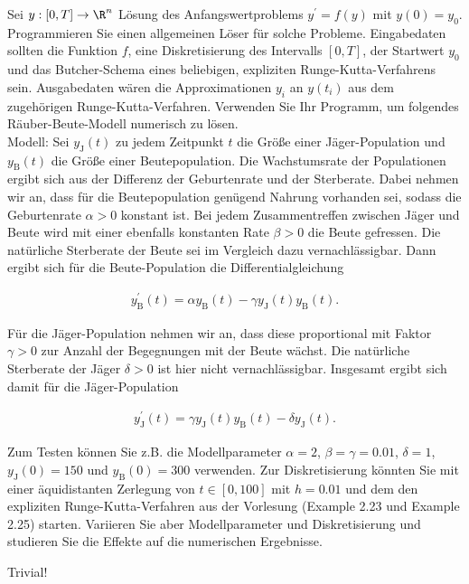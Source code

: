 \begin{exercise}

Sei $y: [0, T] \to \R^n$ Lösung des Anfangswertproblems $y^\prime = f(y)$ mit $y(0) = y_0$.
Programmieren Sie einen allgemeinen Löser für solche Probleme.
Eingabedaten sollten die Funktion $f$, eine Diskretisierung des Intervalls $[0, T]$, der Startwert $y_0$ und das Butcher-Schema eines beliebigen, expliziten Runge-Kutta-Verfahrens sein. Ausgabedaten wären die Approximationen $y_i$ an $y(t_i)$ aus dem zugehörigen Runge-Kutta-Verfahren.
Verwenden Sie Ihr Programm, um folgendes Räuber-Beute-Modell numerisch zu lösen. \\

Modell:
Sei $y_\mathrm{J}(t)$ zu jedem Zeitpunkt $t$ die Größe einer Jäger-Population und $y_\mathrm{B}(t)$ die Größe einer Beutepopulation.
Die Wachstumsrate der Populationen ergibt sich aus der Differenz der Geburtenrate und der Sterberate.
Dabei nehmen wir an, dass für die Beutepopulation genügend Nahrung vorhanden sei, sodass die Geburtenrate $\alpha > 0$ konstant ist.
Bei jedem Zusammentreffen zwischen Jäger und Beute wird mit einer ebenfalls konstanten Rate $\beta > 0$ die Beute gefressen.
Die natürliche Sterberate der Beute sei im Vergleich dazu vernachlässigbar.
Dann ergibt sich für die Beute-Population die Differentialgleichung

\begin{align}
  \label{Beute-Population}
  y_\mathrm{B}^\prime(t)
  =
  \alpha y_\mathrm{B}(t) - \gamma y_\mathrm{J}(t) y_\mathrm{B}(t).
  \tag{1a}
\end{align}

Für die Jäger-Population nehmen wir an, dass diese proportional mit Faktor $\gamma > 0$ zur Anzahl der Begegnungen mit der Beute wächst.
Die natürliche Sterberate der Jäger $\delta > 0$ ist hier nicht vernachlässigbar.
Insgesamt ergibt sich damit für die Jäger-Population

\begin{align}
  \label{Jäger-Population}
  y_\mathrm{J}^\prime(t)
  =
  \gamma y_\mathrm{J}(t) y_\mathrm{B}(t) - \delta y_\mathrm{J}(t).
  \tag{1b}
\end{align}

Zum Testen können Sie z.B. die Modellparameter $\alpha = 2$, $\beta = \gamma = 0.01$, $\delta = 1$, $y_\mathrm{J}(0) = 150$ und $y_\mathrm{B}(0) = 300$ verwenden.
Zur Diskretisierung könnten Sie mit einer äquidistanten Zerlegung von $t \in [0, 100]$ mit $h = 0.01$ und dem den expliziten Runge-Kutta-Verfahren aus der Vorlesung (Example 2.23 und Example 2.25) starten.
Variieren Sie aber Modellparameter und Diskretisierung
und studieren Sie die Effekte auf die numerischen Ergebnisse.

\end{exercise}

\begin{solution}

Trivial!

\end{solution}
